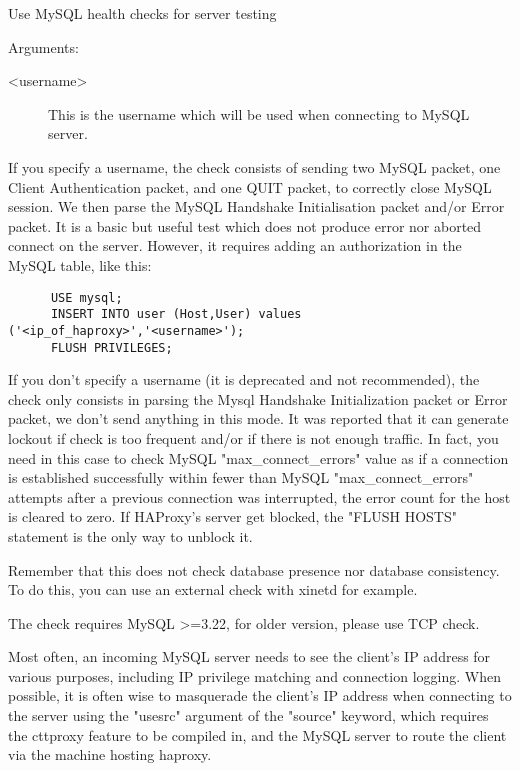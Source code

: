   Use MySQL health checks for server testing


  Arguments:
\begin{description}
\item[<username>] This is the username which will be used when connecting to MySQL
               server.
\end{description}

  If you specify a username, the check consists of sending two MySQL packet,
  one Client Authentication packet, and one QUIT packet, to correctly close
  MySQL session. We then parse the MySQL Handshake Initialisation packet and/or
  Error packet. It is a basic but useful test which does not produce error nor
  aborted connect on the server. However, it requires adding an authorization
  in the MySQL table, like this:

\begin{verbatim}
      USE mysql;
      INSERT INTO user (Host,User) values ('<ip_of_haproxy>','<username>');
      FLUSH PRIVILEGES;
\end{verbatim}

  If you don't specify a username (it is deprecated and not recommended), the
  check only consists in parsing the Mysql Handshake Initialization packet or
  Error packet, we don't send anything in this mode. It was reported that it
  can generate lockout if check is too frequent and/or if there is not enough
  traffic. In fact, you need in this case to check MySQL "max\_connect\_errors"
  value as if a connection is established successfully within fewer than MySQL
  "max\_connect\_errors" attempts after a previous connection was interrupted,
  the error count for the host is cleared to zero. If HAProxy's server get
  blocked, the "FLUSH HOSTS" statement is the only way to unblock it.

  Remember that this does not check database presence nor database consistency.
  To do this, you can use an external check with xinetd for example.

  The check requires MySQL >=3.22, for older version, please use TCP check.

  Most often, an incoming MySQL server needs to see the client's IP address for
  various purposes, including IP privilege matching and connection logging.
  When possible, it is often wise to masquerade the client's IP address when
  connecting to the server using the "usesrc" argument of the "source" keyword,
  which requires the cttproxy feature to be compiled in, and the MySQL server
  to route the client via the machine hosting haproxy.


